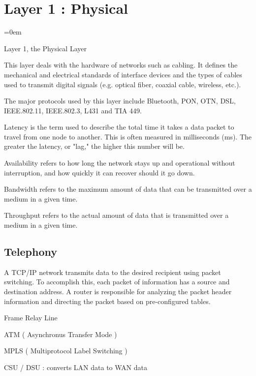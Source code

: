 
\section{Layer 1 : Physical}
\label{sec:layer_1_physical}
\parindent=0em

Layer 1, the Physical Layer

This layer deals with the hardware of networks such as cabling. It defines the mechanical and electrical standards of interface devices and the types of cables used to transmit digital signals (e.g. optical fiber, coaxial cable, wireless, etc.).

The major protocols used by this layer include Bluetooth, PON, OTN, DSL, IEEE.802.11, IEEE.802.3, L431 and TIA 449.


Latency is the term used to describe the total time it takes a data packet to
travel from one node to another. This is often measured in milliseconds (ms).
The greater the latency, or "lag," the higher this number will be.

Availability refers to how long the network stays up and operational without
interruption, and how quickly it can recover should it go down.

Bandwidth refers to the maximum amount of data that can be transmitted over a
medium in a given time.

Throughput refers to the actual amount of data that is transmitted over a medium
in a given time.

\subsection{Telephony}
\label{ssec:telephony}




A TCP/IP network transmits data to the desired recipient using packet switching.
To accomplish this, each packet of information has a source and destination
address. A router is responsible for analyzing the packet header information and
directing the packet based on pre-configured tables.

Frame Relay Line

ATM ( Asynchronus Transfer Mode )

MPLS ( Multiprotocol Label Switching )




CSU / DSU : converts LAN data to WAN data

